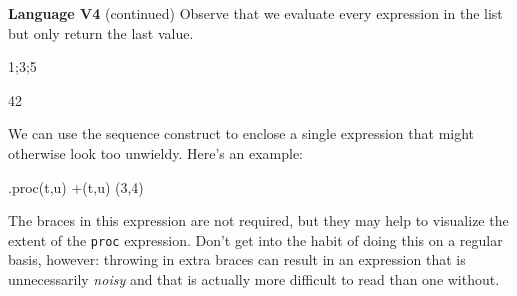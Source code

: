 \begin{minipage}[t]{\sw}
\slidenumber
\LARGE
{\bf Language V4} (continued)\exx
Observe that we evaluate every expression in the list
but only return the last value.
\begin{qv}
{1;3;5}

{42}
\end{qv}
We can use the sequence construct to enclose a single expression
that might otherwise look too unwieldy.
Here's an example:
\begin{qv}
.{proc(t,u) +(t,u)} (3,4)
\end{qv}
The braces in this expression are not required,
but they may help to visualize the extent
of the \verb'proc' expression.
Don't get into the habit
of doing this on a regular basis, however:
throwing in extra braces can result
in an expression that is unnecessarily {\em noisy}
and that is actually more difficult to read
than one without.
\end{minipage}
\clearpage
